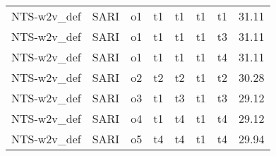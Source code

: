 \begin{tabular}{lllllllr}
 NTS-w2v\_def &      SARI &     o1 &         t1 &       t1 &         t1 &           t1 &                   31.11 \\
 NTS-w2v\_def &      SARI &     o1 &         t1 &       t1 &         t1 &           t3 &                   31.11 \\
 NTS-w2v\_def &      SARI &     o1 &         t1 &       t1 &         t1 &           t4 &                   31.11 \\
 NTS-w2v\_def &      SARI &     o2 &         t2 &       t2 &         t1 &           t2 &                   30.28 \\
 NTS-w2v\_def &      SARI &     o3 &         t1 &       t3 &         t1 &           t3 &                   29.12 \\
 NTS-w2v\_def &      SARI &     o4 &         t1 &       t4 &         t1 &           t4 &                   29.12 \\
 NTS-w2v\_def &      SARI &     o5 &         t4 &       t4 &         t1 &           t4 &                   29.94 \\
\bottomrule
\end{tabular}

